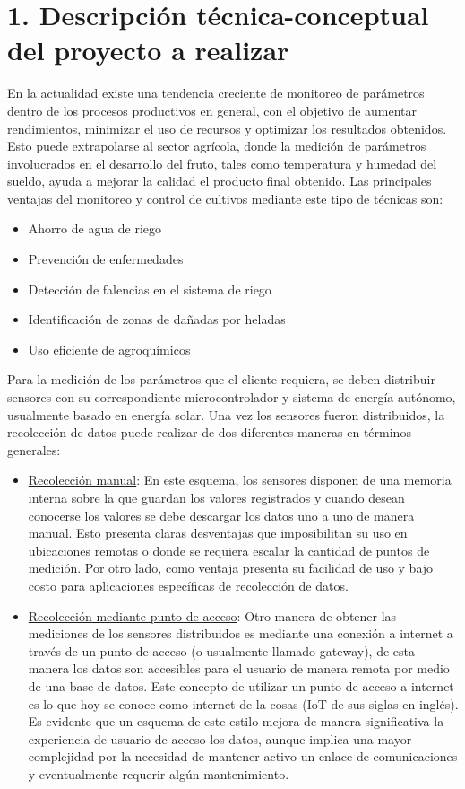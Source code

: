 \documentclass[
11pt, %
codirector, %
]{charter}
\begin{document}
\section{1. Descripción técnica-conceptual del proyecto a realizar}
\label{sec:descripcion}

En la actualidad existe una tendencia creciente de monitoreo de parámetros dentro de los procesos productivos en general, con el objetivo de aumentar rendimientos, minimizar el uso de recursos y optimizar los resultados obtenidos. Esto puede extrapolarse al sector agrícola, donde la medición de parámetros involucrados en el desarrollo del fruto, tales como temperatura y humedad del sueldo, ayuda a mejorar la calidad el producto final obtenido. Las principales ventajas del monitoreo y control de cultivos mediante este tipo de técnicas son:

\begin{itemize}
\item Ahorro de agua de riego
\item Prevención de enfermedades
\item Detección de falencias en el sistema de riego
\item Identificación de zonas de dañadas por heladas
\item Uso eficiente de agroquímicos
\end{itemize}

Para la medición de los parámetros que el cliente requiera, se deben distribuir sensores con su correspondiente microcontrolador y sistema de energía autónomo, usualmente basado en energía solar. Una vez los sensores fueron distribuidos, la recolección de datos puede realizar de dos diferentes maneras en términos generales:

\begin{itemize}
\item \underline {Recolección manual}: En este esquema, los sensores disponen de una memoria interna sobre la que guardan los valores registrados y cuando desean conocerse los valores se debe descargar los datos uno a uno de manera manual. Esto presenta claras desventajas que imposibilitan su uso en ubicaciones remotas o donde se requiera escalar la cantidad de puntos de medición. Por otro lado, como ventaja presenta su facilidad de uso y bajo costo para aplicaciones específicas de recolección de datos.

\item \underline{Recolección mediante punto de acceso}: Otro manera de obtener las mediciones de los sensores distribuidos es mediante una conexión a internet a través de un punto de acceso (o usualmente llamado gateway), de esta manera los datos son accesibles para el usuario de manera remota por medio de una base de datos. Este concepto de utilizar un punto de acceso a internet es lo que hoy se conoce como internet de la cosas (IoT de sus siglas en inglés). Es evidente que un esquema de este estilo mejora de manera significativa la experiencia de usuario de acceso los datos, aunque implica una mayor complejidad por la necesidad de mantener activo un enlace de comunicaciones y eventualmente requerir algún mantenimiento.
\end{itemize}
\end{document}
